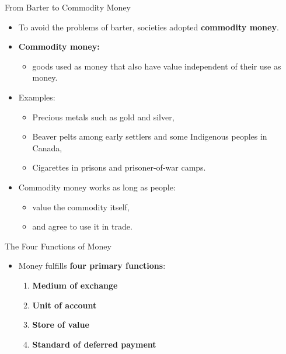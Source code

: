 \documentclass[aspectratio=169]{beamer}
\begin{document}
\begin{frame}{From Barter to Commodity Money}
\transfade
\begin{itemize}[<+->]
  \item To avoid the problems of barter, societies adopted \textbf{commodity money}.
  \item \textbf{Commodity money:}
  \begin{itemize}[<+->]
    \item goods used as money that also have value independent of their use as money.
  \end{itemize}
  \item Examples:
  \begin{itemize}[<+->]
    \item Precious metals such as \alert{gold} and \alert{silver},
    \item Beaver pelts among early settlers and some Indigenous peoples in Canada,
    \item Cigarettes in prisons and prisoner-of-war camps.
  \end{itemize}
  \item Commodity money works as long as people:
  \begin{itemize}[<+->]
    \item value the commodity itself,
    \item and agree to use it in trade.
  \end{itemize}
\end{itemize}
\end{frame}

\begin{frame}{The Four Functions of Money}
\transfade
\begin{itemize}[<+->]
  \item Money fulfills \textbf{four primary functions}:
  \begin{enumerate}[<+->]
    \item \textbf{Medium of exchange}
    \item \textbf{Unit of account}
    \item \textbf{Store of value}
    \item \textbf{Standard of deferred payment}
  \end{enumerate}
\end{itemize}
\end{frame}
\end{document}
